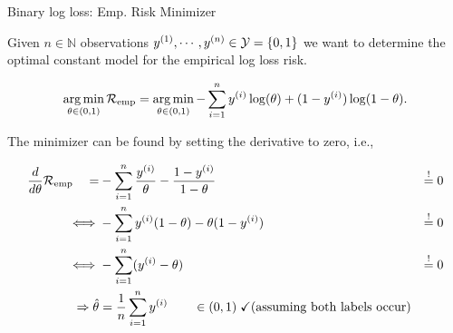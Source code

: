 \documentclass[11pt,compress,t,notes=noshow, xcolor=table]{beamer}
\newcommand{\argminl}{\mathop{\operatorname{arg\,min}}\limits}
\begin{document}
\begin{framev}[fs=small]{Binary log loss: Emp. Risk Minimizer}

Given $n \in \mathbb{N}$ observations $y^{(1)}, \cdots, y^{(n)} \in \mathcal{Y} = \{0, 1\}$ we want to determine the optimal constant model for the empirical log loss risk.

\vfill

$$
\argminl_{\theta \in (0, 1)}\riske = 
\argminl_{\theta \in (0, 1)}-\sum^n_{i=1} y^{(i)}\log(\theta) + (1-y^{(i)})\log(1-\theta).
$$

The minimizer can be found by setting the derivative to zero, i.e.,

\vfill

\begin{align*}
\frac{d}{d\theta}\mathcal{R}_{\text{emp}}\quad   = & 
-\sum^n_{i=1} \frac{y^{(i)}}{\theta} - \frac{1-y^{(i)}}{1-\theta}  &\overset{!}{=}  0\\
\quad\iff&  -\sum^n_{i=1} y^{(i)}(1-\theta) - \theta(1-y^{(i)})   &\overset{!}{=} 0\\
\quad \iff&  -\sum^n_{i=1} (y^{(i)} - \theta)  & \overset{!}{=} 0 \\
\Rightarrow \hat{\theta}& = \frac{1}{n}\sum^n_{i=1} y^{(i)}\quad \quad\in (0,1)\;\checkmark \text{(assuming both labels occur)}
\end{align*}

\end{framev}
\end{document}
